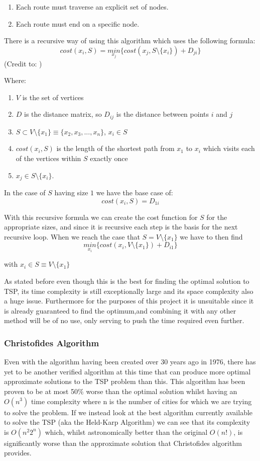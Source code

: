 \documentclass[11pt,a4paper,titlepage]{article}
\begin{document}
\begin{enumerate}
\item Each route must traverse an explicit set of nodes.
\item Each route must end on a specific node.
\end{enumerate}

There is a recursive way of using this algorithm which uses the following formula:
\[cost(x_i, S)=\underset{x_j}{min}\{cost(x_j, S\setminus\{x_i\}) + D_{ji}\}\]
(Credit to: \cite{HeldKarpAlg2})

Where:
\begin{enumerate}
\item $V$ is the set of vertices
\item $D$ is the distance matrix, so $D_{ij}$ is the distance between points $i$ and $j$
\item $S \subset V\setminus\{x_1\} \equiv \{x_2,x_3,...,x_n\}$, $x_i \in S$
\item $cost(x_i,S)$ is the length of the shortest path from $x_1$ to $x_i$ which visits each of the vertices within $S$ exactly once
\item $x_j \in S\setminus\{x_i\}$.
\end{enumerate}


In the case of $S$ having size $1$ we have the base case of:
\[cost(x_i,S) = D_{1i}\]

With this recursive formula we can create the cost function for $S$ for the appropriate sizes, and since it is recursive each step is the basis for the next recursive loop. When we reach the case that $S = V\setminus\{x_1\}$ we have to then find \[\underset{x_i}{min}\{cost(x_i,V\setminus\{x_1\}) + D_{i1}\}\]

with $x_i \in S \equiv V \setminus\{x_1\}$

As stated before even though this is the best for finding the optimal solution to TSP, its time complexity is still exceptionally large and its space complexity also a huge issue. Furthermore for the purposes of this project it is unsuitable since it is already guaranteed to find the optimum,and combining it with any other method will be of no use, only serving to push the time required even further. 

\subsubsection{Christofides Algorithm}
Even with the algorithm having been created over 30 years ago in 1976, there has yet to be another verified algorithm at this time that can produce more optimal approximate solutions to the TSP problem than this. This algorithm has been proven to be at most 50\% worse than the optimal solution whilst having an $O(n^3)$ time complexity where n is the number of cities for which we are trying to solve the problem. \cite{ChrAlg} If we instead look at the best algorithm currently available to solve the TSP (aka the Held-Karp Algorithm) we can see that its complexity is $O(n^2 2^n)$ \cite{HeldKarpAlg} which, whilst astronomically better than the original $O(n!)$, is significantly worse than the approximate solution that Christofides algorithm provides.
\end{document}
